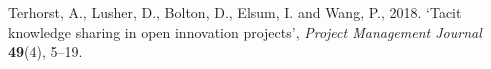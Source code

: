 
\hangindent=0.5cm Terhorst, A., Lusher, D., Bolton, D., Elsum, I. and Wang, P., 2018. \lq Tacit knowledge sharing in open innovation projects\rq, \textit{Project Management Journal} \textbf{49}(4), 5--19.

